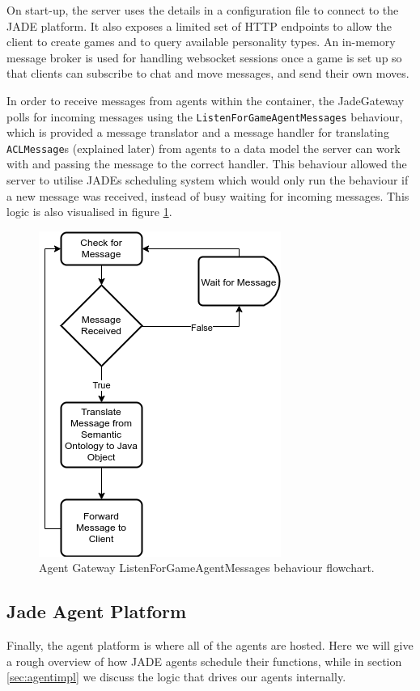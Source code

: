 \documentclass{article}
\begin{document}
On start-up, the server uses the details in a configuration file to connect to the JADE platform. It also exposes a limited set of HTTP endpoints to allow the client to create games and to query available personality types. An in-memory message broker is used for handling websocket sessions once a game is set up so that clients can subscribe to chat and move messages, and send their own moves. 

In order to receive messages from agents within the container, the JadeGateway polls for incoming messages using the \lstinline{ListenForGameAgentMessages} behaviour, which is provided a message translator and a message handler for translating \lstinline{ACLMessage}s (explained later) from agents to a data model the server can work with and passing the message to the correct handler. This behaviour allowed the server to utilise JADEs scheduling system which would only run the behaviour if a new message was received, instead of busy waiting for incoming messages. This logic is also visualised in figure \ref{fig:translate}.

\begin{figure}[!ht]
	\centering
	\includegraphics[width=0.45\linewidth]{images/translate}
	\caption{Agent Gateway ListenForGameAgentMessages behaviour flowchart.}
	\label{fig:translate}
\end{figure}

\subsection{Jade Agent Platform}

Finally, the agent platform is where all of the agents are hosted. Here we will give a rough overview of how JADE agents schedule their functions, while in section \ref{sec:agentimpl} we discuss the logic that drives our agents internally.
\end{document}
